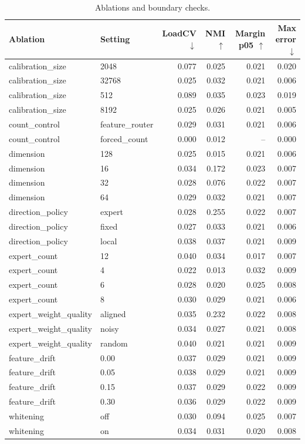 \begin{table}[t]
\centering
\caption{Ablations and boundary checks.}
\label{tab:e6_ablations}
\begin{tabular}{llrrrr}
\toprule
Ablation & Setting & LoadCV $\downarrow$ & NMI $\uparrow$ & Margin p05 $\uparrow$ & Max error $\downarrow$ \\
\midrule
calibration\_size & 2048 & 0.077 & 0.025 & 0.021 & 0.020 \\
calibration\_size & 32768 & 0.025 & 0.032 & 0.021 & 0.006 \\
calibration\_size & 512 & 0.089 & 0.035 & 0.023 & 0.019 \\
calibration\_size & 8192 & 0.025 & 0.026 & 0.021 & 0.005 \\
count\_control & feature\_router & 0.029 & 0.031 & 0.021 & 0.006 \\
count\_control & forced\_count & 0.000 & 0.012 & -- & 0.000 \\
dimension & 128 & 0.025 & 0.015 & 0.021 & 0.006 \\
dimension & 16 & 0.034 & 0.172 & 0.023 & 0.007 \\
dimension & 32 & 0.028 & 0.076 & 0.022 & 0.007 \\
dimension & 64 & 0.029 & 0.032 & 0.021 & 0.007 \\
direction\_policy & expert & 0.028 & 0.255 & 0.022 & 0.007 \\
direction\_policy & fixed & 0.027 & 0.033 & 0.021 & 0.006 \\
direction\_policy & local & 0.038 & 0.037 & 0.021 & 0.009 \\
expert\_count & 12 & 0.040 & 0.034 & 0.017 & 0.007 \\
expert\_count & 4 & 0.022 & 0.013 & 0.032 & 0.009 \\
expert\_count & 6 & 0.028 & 0.020 & 0.025 & 0.008 \\
expert\_count & 8 & 0.030 & 0.029 & 0.021 & 0.006 \\
expert\_weight\_quality & aligned & 0.035 & 0.232 & 0.022 & 0.008 \\
expert\_weight\_quality & noisy & 0.034 & 0.027 & 0.021 & 0.008 \\
expert\_weight\_quality & random & 0.040 & 0.021 & 0.021 & 0.009 \\
feature\_drift & 0.00 & 0.037 & 0.029 & 0.021 & 0.009 \\
feature\_drift & 0.05 & 0.038 & 0.029 & 0.021 & 0.009 \\
feature\_drift & 0.15 & 0.037 & 0.029 & 0.022 & 0.009 \\
feature\_drift & 0.30 & 0.036 & 0.029 & 0.022 & 0.009 \\
whitening & off & 0.030 & 0.094 & 0.025 & 0.007 \\
whitening & on & 0.034 & 0.031 & 0.020 & 0.008 \\
\bottomrule
\end{tabular}
\end{table}
